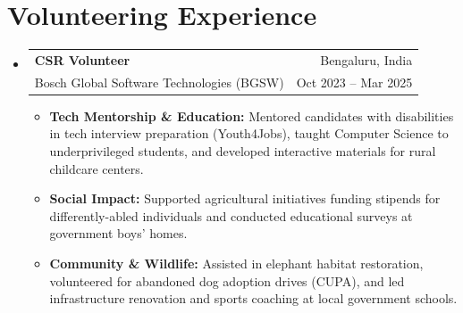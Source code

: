 \documentclass[letterpaper,11pt]{article}
\makeatletter
\newcommand{\resumeItem}[1]{
  \item\small{
    {#1 \vspace{-2pt}}
  }
}
\newcommand{\resumeSubheading}[4]{
  \vspace{-2pt}\item
    \begin{tabular*}{0.97\textwidth}[t]{l@{\extracolsep{\fill}}r}
      \textbf{#1} & #2 \\
      \small#3 & \small #4 \\
    \end{tabular*}\vspace{-7pt}
}
\newcommand{\resumeSubHeadingListStart}{\begin{itemize}[leftmargin=0.15in, label={}]}
\newcommand{\resumeSubHeadingListEnd}{\end{itemize}}
\newcommand{\resumeItemListStart}{\begin{itemize}}
\newcommand{\resumeItemListEnd}{\end{itemize}\vspace{-5pt}}
\makeatother
\begin{document}


\section{Volunteering Experience}

\resumeSubHeadingListStart
  \resumeSubheading{CSR Volunteer}{Bengaluru, India}{Bosch Global Software Technologies (BGSW)}{Oct 2023 -- Mar 2025}
      \resumeItemListStart
        \resumeItem{\textbf{Tech Mentorship \& Education:} Mentored candidates with disabilities in tech interview preparation (Youth4Jobs), taught Computer Science to underprivileged students, and developed interactive materials for rural childcare centers.}
        \resumeItem{\textbf{Social Impact:} Supported agricultural initiatives funding stipends for differently-abled individuals and conducted educational surveys at government boys' homes.}
        \resumeItem{\textbf{Community \& Wildlife:} Assisted in elephant habitat restoration, volunteered for abandoned dog adoption drives (CUPA), and led infrastructure renovation and sports coaching at local government schools.}
      \resumeItemListEnd
\resumeSubHeadingListEnd
\end{document}
